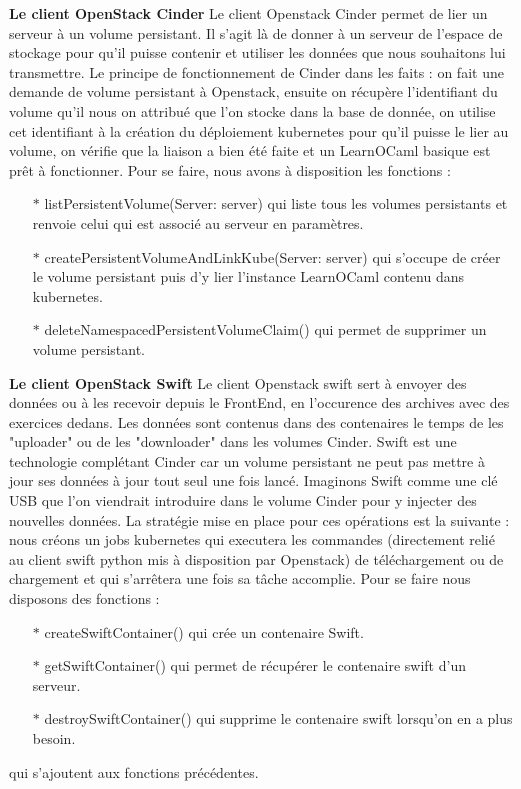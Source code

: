 \documentclass{article}
\begin{document}
\textbf{Le client OpenStack Cinder}
\newline
\newline
Le client Openstack Cinder permet de lier un serveur à un volume persistant. Il s'agit là de donner à un serveur de l'espace de stockage pour qu'il puisse contenir et utiliser les données que nous souhaitons lui transmettre.
\newline
Le principe de fonctionnement de Cinder dans les faits : on fait une demande de volume persistant à Openstack, ensuite on récupère l'identifiant du volume qu'il nous on attribué que l'on stocke dans la base de donnée, on utilise cet identifiant à la création du déploiement kubernetes pour qu'il puisse le lier au volume, on vérifie que la liaison a bien été faite et un LearnOCaml basique est prêt à fonctionner.
\newline
Pour se faire, nous avons à disposition les fonctions :
\begin{itemize}
	\item[$\ast$]listPersistentVolume(Server: server) qui liste tous les volumes persistants et renvoie celui qui est associé au serveur en paramètres.
	\item[$\ast$]createPersistentVolumeAndLinkKube(Server: server) qui s'occupe de créer le volume persistant puis d'y lier l'instance LearnOCaml contenu dans kubernetes.
	\item[$\ast$]deleteNamespacedPersistentVolumeClaim() qui permet de supprimer un volume persistant.
\end{itemize}
\newpage

\textbf{Le client OpenStack Swift}
\newline
\newline
Le client Openstack swift sert à envoyer des données ou à les recevoir depuis le FrontEnd, en l'occurence des archives avec des exercices dedans.
\newline
Les données sont contenus dans des contenaires le temps de les "uploader" ou de les "downloader" dans les volumes Cinder. Swift est une technologie complétant Cinder car un volume persistant ne peut pas mettre à jour ses données à jour tout seul une fois lancé. Imaginons Swift comme une clé USB que l'on viendrait introduire dans le volume Cinder pour y injecter des nouvelles données.
\newline
La stratégie mise en place pour ces opérations est la suivante : nous créons un jobs kubernetes qui executera les commandes (directement relié au client swift python mis à disposition par Openstack) de téléchargement ou de chargement et qui s'arrêtera une fois sa tâche accomplie.
\newline
Pour se faire nous disposons des fonctions :
\begin{itemize}
	\item[$\ast$]createSwiftContainer() qui crée un contenaire Swift.
	\item[$\ast$]getSwiftContainer() qui permet de récupérer le contenaire swift d'un serveur.
	\item[$\ast$]destroySwiftContainer() qui supprime le contenaire swift lorsqu'on en a plus besoin.
\end{itemize}
qui s'ajoutent aux fonctions précédentes.
\newpage
\end{document}
